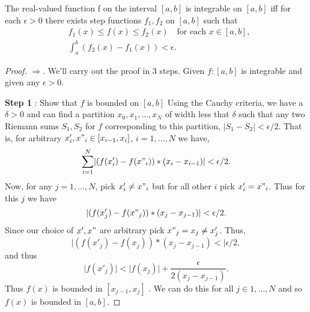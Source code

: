 \begin{Proposition}
    The real-valued function f on the interval $\left[a,b\right]$ is integrable on
    $\left[a,b\right]$ iff for each $\epsilon > 0$ there exists step functions $f_1,f_2$ on
    $\left[a,b\right]$ such that 
    \begin{displaymath}
	\begin{aligned}
	    &f_1(x) \leq f(x) \leq f_2(x) \quad \text{for each } x \in \left[a,b\right], \\
	    &\int_a^b(f_2(x) - f_1(x)) < \epsilon .
	\end{aligned}
    \end{displaymath}
\end{Proposition}
\begin{proof}
    $\Rightarrow$. We'll carry out the proof in 3 steps. Given $f :\left[a,b\right]$ is integrable
and given any $\epsilon > 0$. 

\textbf{Step 1} : Show that $f$ is bounded on $\left[a,b\right]$
Using the Cauchy criteria, we have a $\delta > 0$ and can find a partition $x_0,x_1,\dots,x_N$ of
width less that $\delta$ such that any two Riemann
sums $S_1,S_2$ for $f$ corresponding to this partition, $\lvert S_1 - S_2 \rvert < \epsilon/2$. That
is, for arbitrary $x'_i,x"_i \in \left[x_{i-1},x_{i}\right]$, $i = 1,\dots,N$ we have,
\[ \sum_{i = 1}^N \lvert (f(x'_i) - f(x"_i))*(x_i - x_{i-1}) \rvert < \epsilon/2 .\] Now, for any $j
= 1, \dots, N$, pick $x'_i \neq x"_i$ but for all other $i$ pick $x'_i = x"_i$. Thus for this $j$ we
have 
\[ \lvert (f(x'_j) - f(x"_j))*(x_j - x_{j-1}) \rvert < \epsilon/2 .\] Since our choice of $x',x"$ are
arbitrary pick $x"_j = x_j \neq x'_j$. Thus,
\[ \lvert (f(x'_j) - f(x_j))*(x_j - x_{j-1}) < \lvert \epsilon/2 , \] and thus 
\[ \lvert f(x'_j) \rvert < \lvert f(x_j) \rvert + \frac{\epsilon}{2(x_j - x_{j-1})} .\]
Thus $f(x)$ is bounded in $\left[x_{j-1},x_{j}\right]$ 
. We can do this for all $j \in 1, \dots, N$
and so $f(x)$ is bounded in $\left[a,b\right]$.


\end{proof}
